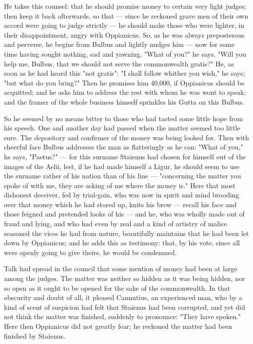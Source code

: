  He takes this counsel: that he should promise money to certain very light judges; then keep it back afterwards, so that --- since he reckoned grave men of their own accord were going to judge strictly --- he should make those who were lighter, in their disappointment, angry with Oppianicus. So, as he was always preposterous and perverse, he begins from Bulbus and lightly nudges him --- now for some time having sought nothing, sad and yawning. "What of you?" he says. "Will you help me, Bulbus, that we should not serve the commonwealth gratis?" He, as soon as he had heard this "not gratis": "I shall follow whither you wish," he says; "but what do you bring?" Then he promises him 40,000, if Oppianicus should be acquitted; and he asks him to address the rest with whom he was wont to speak; and the framer of the whole business himself sprinkles his Gutta on this Bulbus.

 So he seemed by no means bitter to those who had tasted some little hope from his speech. One and another day had passed when the matter seemed too little sure. The depository and confirmer of the money was being looked for. Then with cheerful face Bulbus addresses the man as flatteringly as he can: "What of you," he says, "Paetus?" --- for this surname Staienus had chosen for himself out of the images of the Aelii, lest, if he had made himself a Ligur, he should seem to use the surname rather of his nation than of his line --- "concerning the matter you spoke of with me, they are asking of me where the money is." Here that most dishonest deceiver, fed by trial-gain, who was now in spirit and mind brooding over that money which he had stored up, knits his brow --- recall his face and those feigned and pretended looks of his --- and he, who was wholly made out of fraud and lying, and who had even by zeal and a kind of artistry of malice seasoned the vices he had from nature, beautifully maintains that he had been let down by Oppianicus; and he adds this as testimony: that, by his vote, since all were openly going to give theirs, he would be condemned.

 Talk had spread in the council that some mention of money had been at large among the judges. The matter was neither so hidden as it was being hidden, nor so open as it ought to be opened for the sake of the commonwealth. In that obscurity and doubt of all, it pleased Cannutius, an experienced man, who by a kind of scent of suspicion had felt that Staienus had been corrupted, and yet did not think the matter was finished, suddenly to pronounce: "They have spoken." Here then Oppianicus did not greatly fear; he reckoned the matter had been finished by Staienus.

